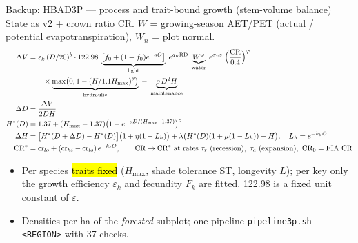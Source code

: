 \begin{frame}{Backup: HBAD3P — process and trait-bound growth (stem-volume balance)}
\footnotesize
State as v2 + crown ratio CR. $W$ = growing-season AET/PET (actual / potential evapotranspiration), $W_n$ = plot normal.
\begin{align*}
\Delta V &= \varepsilon_k\,(D/20)^{b}\cdot 122.98\;\underbrace{\bigl[f_0+(1-f_0)e^{-aO}\bigr]}_{\text{light}}\;e^{g_R\text{RD}}\;\underbrace{W^{\omega}}_{\text{water}}\;e^{\sigma_v z}\;\Bigl(\frac{\text{CR}}{0.4}\Bigr)^{\varphi}\\
&\qquad\times\underbrace{\max\bigl(0,1-(H/1.1H_{\max})^{\theta}\bigr)}_{\text{hydraulic}}\;-\;\underbrace{\rho\,D^2H}_{\text{maintenance}}\\
\Delta D &= \frac{\Delta V}{2DH}\\
H^*(D) &= 1.37+(H_{\max}-1.37)\bigl(1-e^{-sD/(H_{\max}-1.37)}\bigr)^{c}\\
\Delta H &= \bigl[H^*(D+\Delta D)-H^*(D)\bigr]\bigl(1+\eta(1-L_h)\bigr)+\lambda\bigl(H^*(D)(1+\mu(1-L_h))-H\bigr),\quad L_h=e^{-k_hO}\\
\text{CR}^* &= \text{cr}_{lo}+(\text{cr}_{hi}-\text{cr}_{lo})\,e^{-k_cO},\qquad \text{CR}\rightarrow\text{CR}^*\ \text{at rates }\tau_r\ (\text{recession}),\ \tau_e\ (\text{expansion}),\ \text{CR}_0=\text{FIA CR}
\end{align*}
\vspace{-4pt}
\begin{itemize}\setlength\itemsep{1pt}
\item Per species \hl{traits fixed} ($H_{\max}$, shade tolerance ST, longevity $L$); per key only the growth efficiency $\varepsilon_k$ and fecundity $F_k$ are fitted. 122.98 is a fixed unit constant of $\varepsilon$.
\item Densities per ha of the \emph{forested} subplot; one pipeline \texttt{pipeline3p.sh <REGION>} with 37 checks.
\end{itemize}
\end{frame}

